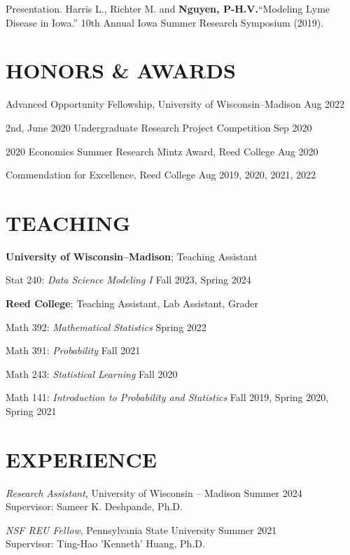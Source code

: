 \documentclass[margin]{res}
\def\pvn{\textbf{Nguyen, P-H.V.}}
\begin{document}
\begin{resume}
Presentation. Harris L., Richter M. and \pvn ``Modeling Lyme Disease in Iowa.” 10th Annual Iowa Summer Research Symposium (2019).


\section{HONORS \& AWARDS} 

Advanced Opportunity Fellowship, University of Wisconsin--Madison \hfill Aug 2022

2nd, June 2020 Undergraduate Research Project Competition \hfill Sep 2020

2020 Economics Summer Research Mintz Award, Reed College \hfill Aug 2020

Commendation for Excellence, Reed College \hfill Aug 2019, 2020, 2021, 2022

\section{TEACHING}

\textbf{University of Wisconsin--Madison}; Teaching Assistant

Stat 240: {\it Data Science Modeling I} \hfill Fall 2023, Spring 2024

\textbf{Reed College}; Teaching Assistant, Lab Assistant, Grader 

Math 392: {\it Mathematical Statistics} \hfill Spring 2022

Math 391: {\it Probability} \hfill Fall 2021

Math 243: {\it Statistical Learning} \hfill Fall 2020

Math 141: {\it Introduction to Probability and Statistics} \hfill Fall 2019, Spring 2020, Spring 2021


\section{EXPERIENCE}

\emph{Research Assistant}, University of Wisconsin -- Madison \hfill Summer 2024 \\
Supervisor: Sameer K. Deshpande, Ph.D.

\emph{NSF REU Fellow}, Pennsylvania State University \hfill Summer 2021 \\
Supervisor: Ting-Hao 'Kenneth' Huang, Ph.D.


\end{resume}
\end{document}
